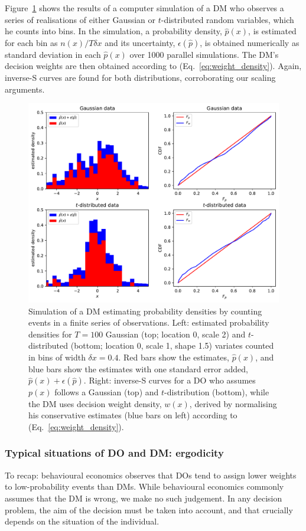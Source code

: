 \documentclass[a4paper, 12pt]{article}
\newcommand{\eref}[1]{(Eq.~\ref{eq:#1})}
\newcommand{\flabel}[1]{\label{fig:#1}}
\newcommand{\Fref}[1]{Figure~\ref{fig:#1}}
\newcommand{\err}{\epsilon}
\begin{document}
\Fref{dm_count_sim} shows the results of a computer simulation of a DM who observes a series of realisations of either Gaussian or $t$-distributed random variables, which he counts into bins. In the simulation, a probability density, $\hat{p}(x)$, is estimated for each bin as $n(x)/T\delta x$ and its uncertainty, $\err(\hat{p})$, is obtained numerically as standard deviation in each $\hat{p}(x)$ over 1000 parallel simulations. The DM's decision weights are then obtained according to \eref{weight_density}. Again, inverse-S curves are found for both distributions, corroborating our scaling arguments.
\begin{figure}[htb]
\centering
\includegraphics[width=1.0\textwidth]{./figs/dm_count_sim.pdf}
\caption{
Simulation of a DM estimating probability densities by counting events in a finite series of observations. Left: estimated probability densities for $T=100$ Gaussian (top; location 0, scale 2) and $t$-distributed (bottom; location 0, scale 1, shape 1.5) variates counted in bins of width $\delta x=0.4$. Red bars show the estimates, $\hat{p}(x)$, and blue bars show the estimates with one standard error added, $\hat{p}(x)+\err({\hat{p}})$. Right: inverse-S curves for a DO who assumes $p(x)$ follows a Gaussian (top) and $t$-distribution (bottom), while the DM uses decision weight density, $w(x)$, derived by normalising his conservative estimates (blue bars on left) according to \eref{weight_density}.
}
\flabel{dm_count_sim}
\end{figure}

\FloatBarrier
\subsubsection{Typical situations of DO and DM: ergodicity}
To recap: behavioural economics observes that DOs tend to assign lower weights to low-probability events than DMs.
While behavioural economics commonly assumes that the DM is wrong, we make no such judgement. In any decision problem, the aim of the decision must be taken into account, and that crucially depends on the situation of the individual. 
\end{document}
